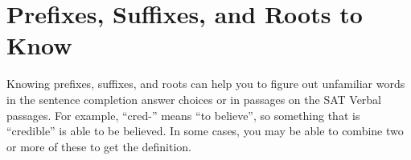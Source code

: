\section{Prefixes, Suffixes, and Roots to Know}

Knowing prefixes, suffixes, and roots can help you to figure out unfamiliar words in the sentence completion answer choices or in passages on the SAT Verbal passages. For example, ``cred-'' means ``to believe'', so something that is ``credible'' is able to be believed. In some cases, you may be able to combine two or more of these to get the definition.